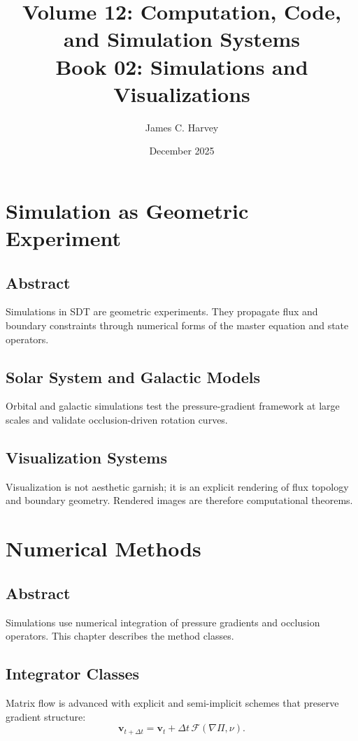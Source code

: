\documentclass[12pt]{book}
\title{Volume 12: Computation, Code, and Simulation Systems \\ Book 02: Simulations and Visualizations}
\author{James C. Harvey}
\date{December 2025}
\begin{document}
\maketitle
\tableofcontents

\chapter{Simulation as Geometric Experiment}

\section*{Abstract}
Simulations in SDT are geometric experiments. They propagate flux and boundary constraints through
numerical forms of the master equation and state operators.

\section{Solar System and Galactic Models}
Orbital and galactic simulations test the pressure-gradient framework at large scales and validate
occlusion-driven rotation curves.

\section{Visualization Systems}
Visualization is not aesthetic garnish; it is an explicit rendering of flux topology and boundary
geometry. Rendered images are therefore computational theorems.

\chapter{Numerical Methods}

\section*{Abstract}
Simulations use numerical integration of pressure gradients and occlusion operators. This chapter
describes the method classes.

\section{Integrator Classes}
Matrix flow is advanced with explicit and semi-implicit schemes that preserve gradient structure:
\begin{equation}
\mathbf{v}_{t+\Delta t} = \mathbf{v}_t + \Delta t\, \mathcal{F}(\nabla \Pi, \nu).
\end{equation}
\end{document}
